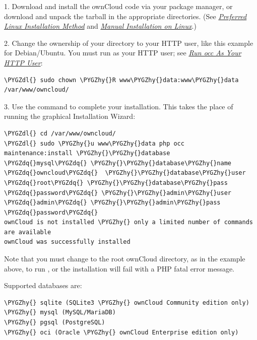 \documentclass[letterpaper,10pt,english]{sphinxmanual}
\def\PYGZdl{\char`\$}
\def\PYGZhy{\char`\-}
\def\PYGZdq{\char`\"}
\begin{document}
1. Download and install the ownCloud code via your package manager, or download
and unpack the tarball in the appropriate directories. (See
{\hyperref[installation/linux_installation::doc]{\emph{\emph{Preferred Linux Installation Method}}}} and {\hyperref[installation/source_installation::doc]{\emph{\emph{Manual Installation on Linux}}}}.)

2. Change the ownership of your  directory to your HTTP user, like
this example for Debian/Ubuntu. You must run  as your HTTP user; see
{\hyperref[configuration_server/occ_command:http\string-user\string-label]{\emph{Run occ As Your HTTP User}}}:

\begin{Verbatim}[commandchars=\\\{\}]
\PYGZdl{} sudo chown \PYGZhy{}R www\PYGZhy{}data:www\PYGZhy{}data /var/www/owncloud/
\end{Verbatim}

3. Use the  command to complete your installation. This takes the place
of running the graphical Installation Wizard:

\begin{Verbatim}[commandchars=\\\{\}]
\PYGZdl{} cd /var/www/owncloud/
\PYGZdl{} sudo \PYGZhy{}u www\PYGZhy{}data php occ  maintenance:install \PYGZhy{}\PYGZhy{}database
\PYGZdq{}mysql\PYGZdq{} \PYGZhy{}\PYGZhy{}database\PYGZhy{}name \PYGZdq{}owncloud\PYGZdq{}  \PYGZhy{}\PYGZhy{}database\PYGZhy{}user \PYGZdq{}root\PYGZdq{} \PYGZhy{}\PYGZhy{}database\PYGZhy{}pass
\PYGZdq{}password\PYGZdq{} \PYGZhy{}\PYGZhy{}admin\PYGZhy{}user \PYGZdq{}admin\PYGZdq{} \PYGZhy{}\PYGZhy{}admin\PYGZhy{}pass \PYGZdq{}password\PYGZdq{}
ownCloud is not installed \PYGZhy{} only a limited number of commands are available
ownCloud was successfully installed
\end{Verbatim}

Note that you must change to the root ownCloud directory, as in the example
above, to run , or the installation will fail with
a PHP fatal error message.

Supported databases are:

\begin{Verbatim}[commandchars=\\\{\}]
\PYGZhy{} sqlite (SQLite3 \PYGZhy{} ownCloud Community edition only)
\PYGZhy{} mysql (MySQL/MariaDB)
\PYGZhy{} pgsql (PostgreSQL)
\PYGZhy{} oci (Oracle \PYGZhy{} ownCloud Enterprise edition only)
\end{Verbatim}
\end{document}
